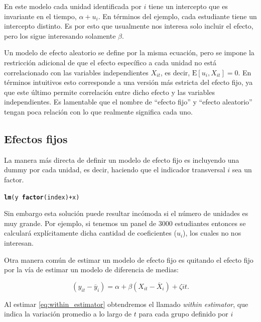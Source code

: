 \documentclass{article}\usepackage[]{graphicx}\usepackage[]{color}
\makeatletter
\newcommand{\hlopt}[1]{\textcolor[rgb]{0,0,0}{#1}}%
\newcommand{\hlstd}[1]{\textcolor[rgb]{0.345,0.345,0.345}{#1}}%
\newcommand{\hlkwd}[1]{\textcolor[rgb]{0.737,0.353,0.396}{\textbf{#1}}}%
\newenvironment{kframe}{%
 \def\at@end@of@kframe{}%
 \ifinner\ifhmode%
  \def\at@end@of@kframe{\end{minipage}}%
  \begin{minipage}{\columnwidth}%
 \fi\fi%
 \def\FrameCommand##1{\hskip\@totalleftmargin \hskip-\fboxsep
 \colorbox{shadecolor}{##1}\hskip-\fboxsep
     \hskip-\linewidth \hskip-\@totalleftmargin \hskip\columnwidth}%
 \MakeFramed {\advance\hsize-\width
   \@totalleftmargin\z@ \linewidth\hsize
   \@setminipage}}%
 {\par\unskip\endMakeFramed%
 \at@end@of@kframe}
\newenvironment{knitrout}{}{} %
\newcommand*{\eng}[1]{\textsl{#1}}
\makeatother
\begin{document}
En este modelo cada unidad identificada por $i$ tiene un intercepto que es invariante en el tiempo, $\alpha + u_i$. En términos del ejemplo, cada estudiante tiene un intercepto distinto. Es por esto que usualmente nos interesa solo incluir el efecto, pero los sigue interesando solamente $\beta$.

Un modelo de efecto aleatorio se define por la misma ecuación, pero se impone la restricción adicional de que el efecto específico a cada unidad no está correlacionado con las variables independientes $X_{it}$, es decir, $\mathrm{E}[u_i, X_{it}] = 0$. En términos intuitivos esto corresponde a una versión más estricta del efecto fijo, ya que este último permite correlación entre dicho efecto y las variables independientes. Es lamentable que el nombre de ``efecto fijo'' y ``efecto aleatorio'' tengan poca relación con lo que realmente significa cada uno.

\subsection{Efectos fijos}

La manera más directa de definir un modelo de efecto fijo es incluyendo una dummy por cada unidad, es decir, haciendo que el indicador transversal $i$ sea un factor.

\begin{knitrout}
\color{fgcolor}\begin{kframe}
\begin{alltt}
\hlkwd{lm}\hlstd{(y} \hlopt{~} \hlkwd{factor}\hlstd{(index)} \hlopt{+} \hlstd{x)}
\end{alltt}


{\ttfamily\noindent\bfseries\color{errorcolor}{\#\# Error in unique.default(x, nmax = nmax): unique() applies only to vectors}}\end{kframe}
\end{knitrout}

Sin embargo esta solución puede resultar incómoda si el número de unidades es muy grande. Por ejemplo, si tenemos un panel de 3000 estudiantes entonces se calculará explícitamente dicha cantidad de coeficientes ($u_i$), los cuales no nos interesan.

Otra manera común de estimar un modelo de efecto fijo es quitando el efecto fijo por la vía de estimar un modelo de diferencia de medias:

\begin{equation}
(y_{it} - \overline{y}_i) = \alpha + \beta (X_{it} - \overline{X}_i)  + \zeta{it}.
\label{eq:within_estimator}
\end{equation}

Al estimar \eqref{eq:within_estimator} obtendremos el llamado \eng{within estimator}, que indica la variación promedio a lo largo de $t$ para cada grupo definido por $i$
 
\nocite{*}
\printbibliography
\end{document}
